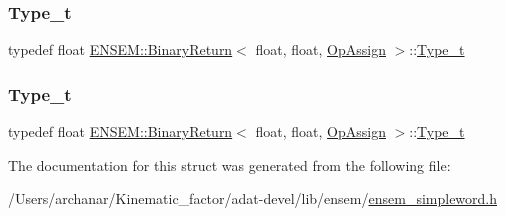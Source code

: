 \mbox{\label{structENSEM_1_1BinaryReturn_3_01float_00_01float_00_01OpAssign_01_4_a65f1032b48415f3cc75ef4be460c1b06}} 
\subsubsection{\texorpdfstring{Type\_t}{Type\_t}\hspace{0.1cm}{\footnotesize\ttfamily [2/3]}}
{\footnotesize\ttfamily typedef float \mbox{\hyperlink{structENSEM_1_1BinaryReturn}{E\+N\+S\+E\+M\+::\+Binary\+Return}}$<$ float, float, \mbox{\hyperlink{structENSEM_1_1OpAssign}{Op\+Assign}} $>$\+::\mbox{\hyperlink{structENSEM_1_1BinaryReturn_3_01float_00_01float_00_01OpAssign_01_4_a65f1032b48415f3cc75ef4be460c1b06}{Type\+\_\+t}}}

\mbox{\label{structENSEM_1_1BinaryReturn_3_01float_00_01float_00_01OpAssign_01_4_a65f1032b48415f3cc75ef4be460c1b06}} 
\subsubsection{\texorpdfstring{Type\_t}{Type\_t}\hspace{0.1cm}{\footnotesize\ttfamily [3/3]}}
{\footnotesize\ttfamily typedef float \mbox{\hyperlink{structENSEM_1_1BinaryReturn}{E\+N\+S\+E\+M\+::\+Binary\+Return}}$<$ float, float, \mbox{\hyperlink{structENSEM_1_1OpAssign}{Op\+Assign}} $>$\+::\mbox{\hyperlink{structENSEM_1_1BinaryReturn_3_01float_00_01float_00_01OpAssign_01_4_a65f1032b48415f3cc75ef4be460c1b06}{Type\+\_\+t}}}



The documentation for this struct was generated from the following file\+:\begin{DoxyCompactItemize}
\item 
/\+Users/archanar/\+Kinematic\+\_\+factor/adat-\/devel/lib/ensem/\mbox{\hyperlink{adat-devel_2lib_2ensem_2ensem__simpleword_8h}{ensem\+\_\+simpleword.\+h}}\end{DoxyCompactItemize}
